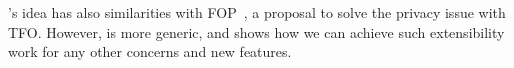 \tcpls's idea has also similarities with \tls FOP~\cite{sy2020enhanced}, a
proposal to solve the privacy issue with TFO. However, \tcpls is more generic,
and shows how we can achieve such extensibility work for any other concerns and
new features.

















